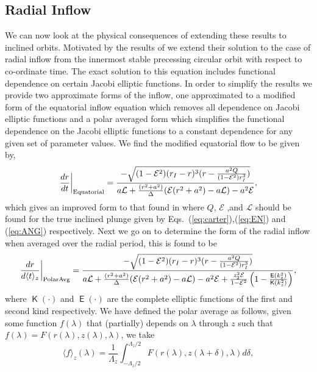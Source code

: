 \documentclass[12pt, amsmath]{revtex4-2}
\newcommand\lam{\lambda}
\newcommand\EN{\mathcal{E}}
\newcommand\ANG{\mathcal{L}}
\newcommand{\elK}{\operatorname{\mathsf{K}}}%
\newcommand{\elE}{\operatorname{\mathsf{E}}}%
\begin{document}
\subsection{Radial Inflow}
We can now look at the physical consequences of extending these results to inclined orbits. Motivated by the results of \cite{Mummery:2022ana} we extend their solution to the case of radial inflow from the innermost stable precessing circular orbit with respect to co-ordinate time. The exact solution to this equation includes functional dependence on certain Jacobi elliptic functions. In order to simplify the results we provide two approximate forms of the inflow, one approximated to a modified form of the equatorial inflow equation which removes all dependence on Jacobi elliptic functions and a polar averaged form which simplifies the functional dependence on the Jacobi elliptic functions to a constant dependence for any given set of parameter values. We find the modified equatorial flow  to be given by,
\begin{equation}\label{eq:radialinflowEquatorial}
     \frac{dr}{ d t}\bigg|_{\rm Equatorial} =\frac{-\sqrt{(1-\EN^2)(r_I-r)^3(r-\frac{a^2Q}{(1-\EN^2)r_{I}^{3}})}}{a\mathcal{L}+\frac{(r^2+a^2)}{\Delta}(\EN(r^2+a^2)-a\mathcal{L})-a^2\EN},
\end{equation}
which gives an improved form to that found in \cite{Mummery:2022ana} where $Q$, $\EN$ ,and $\ANG$ should be found for the true inclined plunge given by Eqs.~(\ref{eq:carter}),(\ref{eq:EN}) and (\ref{eq:ANG}) respectively. Next we go on to determine the form of the radial inflow when averaged over the radial period, this is found to be
\begin{equation}\label{eq:radialinflowPolarAVG}
     \frac{dr}{ d\langle t \rangle _{z}}\bigg|_{\rm PolarAvg} =\frac{-\sqrt{(1-\EN^2)(r_I-r)^3(r-\frac{a^2Q}{(1-\EN^2)r_{I}^{3}})}}{a\mathcal{L}+\frac{(r^2+a^2)}{\Delta}(\mathcal{E}(r^2+a^2)-a\mathcal{L})-  a^2 \EN+ \frac{z_2^2 \EN}{1-\EN^2}\left( 1 - \frac{\elE( k_z^2)}{ \elK(k_z^2)} \right)},
\end{equation}
where $\elK(\cdot)$  and $\elE(\cdot)$ are the complete elliptic functions of the first and second kind respectively. We have defined the polar average as follows, given some function $f(\lambda)$ that (partially) depends on $\lam$ through $z$ such that $f(\lambda)=F(r(\lam),z(\lam),\lam)$, we take 
\begin{equation}
\langle f \rangle _{z}(\lam) = \frac{1}{\Lambda_z}\int_{-\Lambda_z/2}^{\Lambda_z/2}F(r(\lam),z(\lam+\delta),\lam)d\delta,
\end{equation}
\end{document}
